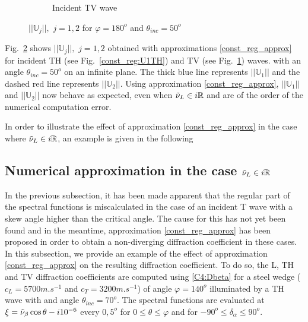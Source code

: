 \begin{figure}
\begin{subfigure}[b]{0.45\textwidth}
        \caption{Incident TV wave}
        \label{const_reg:U1TV}
    \end{subfigure} 
\caption{$||\mathbb{U}_j||, \, \, j=1,2$ for $\varphi=180^o$ and $\theta_{inc}=50^o$}
\label{const_reg:U1}
\end{figure}

Fig.~\ref{const_reg:U1} shows $||\mathbb{U}_j||, \, \, j=1,2$ obtained with approximations \eqref{const_reg_approx} for incident TH (see Fig.~\ref{const_reg:U1TH}) and TV (see Fig.~\ref{const_reg:U1TV}) waves. with an angle $\theta_{inc}=50^o$ on an infinite plane. The thick blue line represents $||\mathbb{U}_1||$ and the dashed red line represents $||\mathbb{U}_2||$. Using  approximation \eqref{const_reg_approx}, $||\mathbb{U}_1||$ and $||\mathbb{U}_2||$ now behave as expected, even when $\tilde{\nu}_L \in i\mathbb{R}$ and are  of the order of the numerical computation error.

In order to illustrate the effect of approximation \eqref{const_reg_approx} in the case where $\tilde{\nu}_L \in i\mathbb{R}$, an example is given in the following

\subsection{Numerical approximation in the case $\tilde{\nu}_L \in i\mathbb{R}$}

In the previous subsection, it has been made apparent that the regular part of the spectral functions is miscalculated in the case of an incident T wave with a skew angle higher than the critical angle. The cause for this has not yet been found and in the meantime, approximation \eqref{const_reg_approx} has been proposed in order to obtain a non-diverging diffraction coefficient in these cases. In this subsection, we provide an example of the effect of approximation \eqref{const_reg_approx} on the resulting diffraction coefficient. To do so, the L, TH and TV diffraction coefficients are computed using \eqref{C4:Dbeta} for a steel wedge ($c_L=5700m.s^{-1}$ and $c_T=3200m.s^{-1}$) of angle $\varphi=140^o$ illuminated by a TH wave with and angle $\theta_{inc}=70^o$. The spectral functions are evaluated at $\xi=\tilde{\nu}_{\beta}\cos\theta -i10^{-6}$ every $0,5^o$ for $0\leq\theta\leq \varphi$ and for $-90^o\leq \delta_{\alpha} \leq 90^o$.

